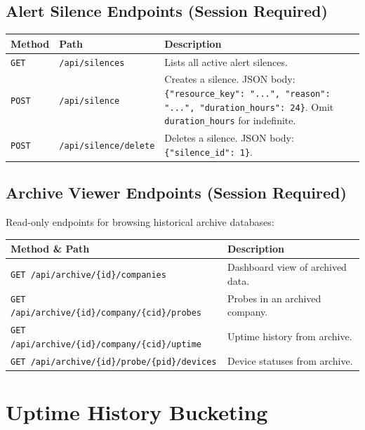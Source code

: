 \documentclass[12pt]{report}
\begin{document}
\subsection{Alert Silence Endpoints (Session Required)}

\begin{longtable}{@{} l l p{5cm} @{}}
\toprule
\textbf{Method} & \textbf{Path} & \textbf{Description} \\
\midrule
\texttt{GET} & \texttt{/api/silences} & Lists all active alert silences. \\
\texttt{POST} & \texttt{/api/silence} & Creates a silence. JSON body:
    \texttt{\{"resource\_key": "...", "reason": "...",
    "duration\_hours": 24\}}. Omit \texttt{duration\_hours} for indefinite.
    \\
\texttt{POST} & \texttt{/api/silence/delete} & Deletes a silence. JSON body:
    \texttt{\{"silence\_id": 1\}}. \\
\bottomrule
\end{longtable}

\subsection{Archive Viewer Endpoints (Session Required)}

Read-only endpoints for browsing historical archive databases:

\begin{longtable}{@{} l p{9cm} @{}}
\toprule
\textbf{Method \& Path} & \textbf{Description} \\
\midrule
\texttt{GET /api/archive/\{id\}/companies} & Dashboard view of archived data.
    \\
\texttt{GET /api/archive/\{id\}/company/\{cid\}/probes} & Probes in an
    archived company. \\
\texttt{GET /api/archive/\{id\}/company/\{cid\}/uptime} & Uptime history from
    archive. \\
\texttt{GET /api/archive/\{id\}/probe/\{pid\}/devices} & Device statuses from
    archive. \\
\bottomrule
\end{longtable}

\section{Uptime History Bucketing}
\end{document}
